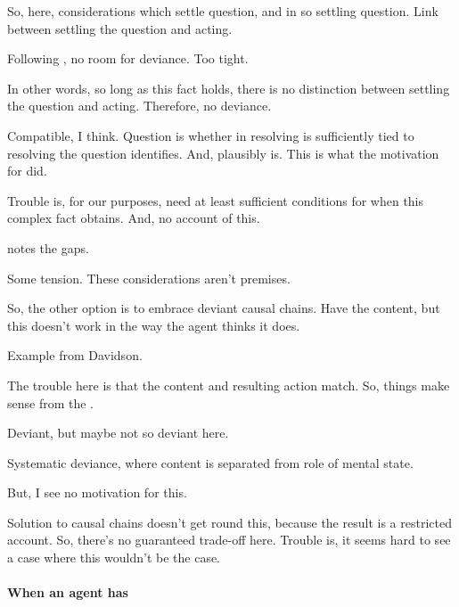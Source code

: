 \begin{note}
  So, here, considerations which settle question, and in so settling question.
  Link between settling the question and acting.

  Following \citeauthor{Hieronymi:2011aa}, no room for deviance.
  Too tight.

  In other words, so long as this fact holds, there is no distinction between settling the question and acting.
  Therefore, no deviance.

  Compatible, I think.
  Question is whether in resolving \qzS{} is sufficiently tied to resolving the question \citeauthor{Hieronymi:2011aa} identifies.
  And, plausibly is.
  This is what the motivation for \qzS{} did.

  Trouble is, for our purposes, need at least sufficient conditions for when this complex fact obtains.
  And, no account of this.

  \citeauthor{Hieronymi:2011aa} notes the gaps.

  Some tension.
  These considerations aren't premises.
\end{note}

\begin{note}
  So, the other option is to embrace deviant causal chains.
  Have the content, but this doesn't work in the way the agent thinks it does.

  Example from Davidson.

  The trouble here is that the content and resulting action match.
  So, things make sense from the \agpe{}.

  Deviant, but maybe not so deviant here.

  Systematic deviance, where content is separated from role of mental state.

  But, I see no motivation for this.

  Solution to causal chains doesn't get round this, because the result is a restricted account.
  So, there's no guaranteed trade-off here.
  Trouble is, it seems hard to see a case where this wouldn't be the case.
\end{note}

\paragraph{When an agent has \zS{}}

